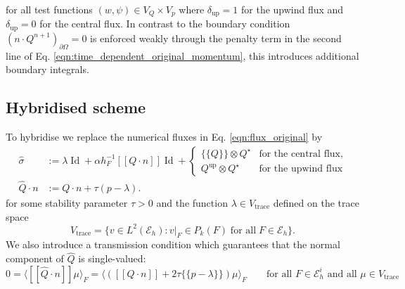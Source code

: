 \documentclass[11pt]{article}
\newcommand{\jump}[1]{[\![ #1]\!]}
\newcommand{\avg}[1]{\{\!\{#1\}\!\}}
\newcommand{\Id}{\operatorname{Id}}
\begin{document}
for all test functions $(w,\psi) \in V_Q\times V_p$ where $\delta_{\text{up}}=1$ for the upwind flux and $\delta_{\text{up}}=0$ for the central flux. In contrast to \cite{Guzman2016} the boundary condition $(n\cdot Q^{n+1})_{\partial \Omega}=0$ is enforced weakly through the penalty term in the second line of Eq. \eqref{eqn:time_dependent_original_momentum}, this introduces additional boundary integrals.
\subsection{Hybridised scheme}\label{sec:hdg_implicit}
To hybridise we replace the numerical fluxes in Eq. \eqref{eqn:flux_original} by
\begin{equation}
    \begin{aligned}
        \widehat{\sigma}   & := \lambda \Id  + \alpha h_F^{-1} \jump{Q\cdot n} \Id       + \begin{cases}
                                                                                               \avg{Q}\otimes Q^\star       & \text{for the central flux}, \\
                                                                                               Q^{\text{up}}\otimes Q^\star & \text{for the upwind flux}
                                                                                           \end{cases} \\
        \widehat{Q}\cdot n & := Q\cdot n + \tau (p-\lambda).
    \end{aligned}\label{eqn:flux_hdg}
\end{equation}
for some stability parameter $\tau>0$ and the function $\lambda\in V_\text{trace}$ defined on the trace space
\begin{equation}
    V_{\text{trace}} = \{ v\in L^2(\mathcal{E}_h) : v|_F \in P_k(F) \;\text{for all}\;F\in \mathcal{E}_h \}.
\end{equation}
We also introduce a transmission condition which guarantees that the normal component of $\widehat{Q}$ is single-valued:
\begin{equation}
    0 = \langle \jump{\widehat{Q}\cdot n} \mu \rangle_F = \langle (\jump{Q\cdot n} + 2\tau\avg{p-\lambda})\mu \rangle_F \qquad \text{for all $F\in\mathcal{E}_h^i$ and all $\mu\in V_{\text{trace}}$} \label{eqn:jump_condition_interior}
\end{equation}
\end{document}
